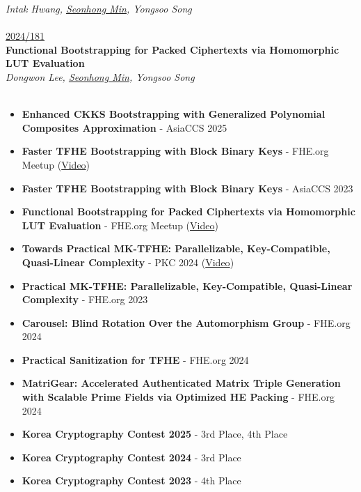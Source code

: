 \documentclass[a4paper, 10pt, twocolumn]{article}
\begin{document}
\textit{Intak Hwang, \underline{Seonhong Min}, Yongsoo Song} \\
\\
 {\small \href{https://eprint.iacr.org/2024/181}{2024/181}}\\
\textbf{Functional Bootstrapping for Packed Ciphertexts via Homomorphic LUT Evaluation} \\
\textit{Dongwon Lee, \underline{Seonhong Min}, Yongsoo Song} \\
\\
\begin{itemize}
\item \textbf{Enhanced CKKS Bootstrapping with Generalized Polynomial Composites Approximation} - AsiaCCS 2025
\item \textbf{Faster TFHE Bootstrapping with Block Binary Keys} - FHE.org Meetup ({\small \href{https://www.youtube.com/watch?v=SkdnewzruNA}{Video}})
\item \textbf{Faster TFHE Bootstrapping with Block Binary Keys} - AsiaCCS 2023
\item \textbf{Functional Bootstrapping for Packed Ciphertexts via Homomorphic LUT Evaluation} - FHE.org Meetup ({\small \href{https://www.youtube.com/watch?v=ngOQGLvBsCw}{Video}})
\item \textbf{Towards Practical MK-TFHE: Parallelizable, Key-Compatible, Quasi-Linear Complexity} - PKC 2024 ({\small \href{https://www.youtube.com/watch?v=Bp6a_zmYrG0}{Video}})
\end{itemize}

\begin{itemize}
\item \textbf{Practical MK-TFHE: Parallelizable, Key-Compatible, Quasi-Linear Complexity} - FHE.org 2023
\item \textbf{Carousel: Blind Rotation Over the Automorphism Group} - FHE.org 2024
\item \textbf{Practical Sanitization for TFHE} - FHE.org 2024
\item \textbf{MatriGear: Accelerated Authenticated Matrix Triple Generation with Scalable Prime Fields via Optimized HE Packing} - FHE.org 2024
\end{itemize}

\begin{itemize}
\item \textbf{Korea Cryptography Contest 2025} - 3rd Place, 4th Place
\item \textbf{Korea Cryptography Contest 2024} - 3rd Place
\item \textbf{Korea Cryptography Contest 2023} - 4th Place
\end{itemize}
\end{document}
